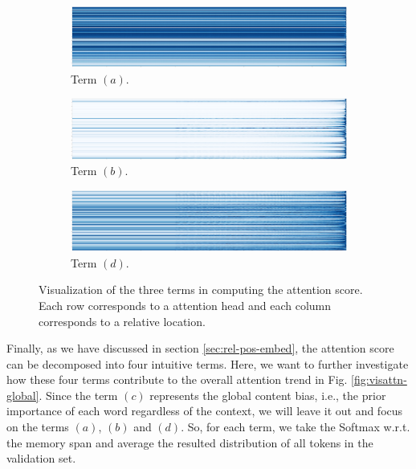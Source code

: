 \begin{figure}[!h]
	\begin{subfigure}[b]{\linewidth}
		\includegraphics[width=\textwidth]{FIG/rel-A-avg.png}
		\caption{Term $(a)$.}
		\label{fig:visattn-A}
	\end{subfigure}
	\begin{subfigure}[b]{\linewidth}
		\includegraphics[width=\textwidth]{FIG/rel-B-avg.png}
		\caption{Term $(b)$.}
		\label{fig:visattn-B}
	\end{subfigure}
	\begin{subfigure}[b]{\linewidth}
		\includegraphics[width=\textwidth]{FIG/rel-D-avg.png}
		\caption{Term $(d)$.}
		\label{fig:visattn-D}
	\end{subfigure}
	\caption{Visualization of the three terms in computing the attention score. Each row corresponds to a attention head and each column corresponds to a relative location.}
	\label{fig:visattn-decomp}
\end{figure}
Finally, as we have discussed in section \ref{sec:rel-pos-embed}, the attention score can be decomposed into four intuitive terms.
Here, we want to further investigate how these four terms contribute to the overall attention trend in Fig. \ref{fig:visattn-global}.
Since the term $(c)$ represents the global content bias, i.e., the prior importance of each word regardless of the context, we will leave it out and focus on the terms $(a)$, $(b)$ and $(d)$.
So, for each term, we take the Softmax w.r.t. the memory span and average the resulted distribution of all tokens in the validation set.
